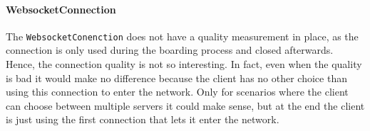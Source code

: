 \paragraph{WebsocketConnection}
The \lstinline|WebsocketConenction| does not have a quality measurement in place, as the connection is only used during the boarding process and closed afterwards. Hence, the connection quality is not so interesting. In fact, even when the quality is bad it would make no difference because the client has no other choice than using this connection to enter the network. Only for scenarios where the client can choose between multiple \signal servers it could make sense, but at the end the client is just using the first connection that lets it enter the network.



